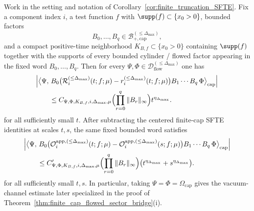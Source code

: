 \begin{propFspecial}\label{prop:finite_cap_bounded_factor_insertion}
Work in the setting and notation of Corollary~\ref{cor:finite_truncation_SFTE}.
Fix a component index $i$, a test function $f$ with $\supp(f)\subset\{x_0>0\}$, bounded factors
\[
B_0,\dots,B_q\in \mathcal B^{(\le \Delta_{\max})}_{+,\mathrm{cap}},
\]
and a compact positive-time neighborhood $K_{B,f}\subset\{x_0>0\}$ containing $\supp(f)$ together with the supports of every bounded cylinder / flowed factor appearing in the fixed word $B_0,\dots,B_q$.
Then for every $\Psi,\Phi\in \mathcal D^{(\le \Delta_{\max})}_{\mathrm{flow}}$ one has
\[
\begin{aligned}
&\Big|
\big\langle
\Psi,\,
B_0\bigl(\mathcal R_i^{(\le \Delta_{\max})}(t;f;\mu)-r_i^{(\le \Delta_{\max})}(t;f;\mu)\bigr)
B_1\cdots B_q\,\Phi
\big\rangle_{\mathrm{cap}}
\Big|\\
&\qquad\le
C_{\Psi,\Phi,K_{B,f},i,\Delta_{\max},\mu}
\Bigl(\prod_{r=0}^q \|B_r\|_{\infty}\Bigr)
 t^{\eta_{\Delta_{\max}}}.
\end{aligned}
\]
for all sufficiently small $t$.
After subtracting the centered finite-cap SFTE identities at scales $t,s$, the same fixed bounded word satisfies
\[
\begin{aligned}
&\Big|
\big\langle
\Psi,\,
B_0\bigl(
\mathcal O_i^{\mathrm{app},(\le \Delta_{\max})}(t;f;\mu)
-\mathcal O_i^{\mathrm{app},(\le \Delta_{\max})}(s;f;\mu)
\bigr)
B_1\cdots B_q\,\Phi
\big\rangle_{\mathrm{cap}}
\Big|\\
&\qquad\le
C'_{\Psi,\Phi,K_{B,f},i,\Delta_{\max},\mu}
\Bigl(\prod_{r=0}^q \|B_r\|_{\infty}\Bigr)
\bigl(t^{\eta_{\Delta_{\max}}}+s^{\eta_{\Delta_{\max}}}\bigr).
\end{aligned}
\]
for all sufficiently small $t,s$.
In particular, taking $\Psi=\Phi=\Omega_{\mathrm{cap}}$ gives the vacuum-channel estimate later specialized in the proof of Theorem~\ref{thm:finite_cap_flowed_sector_bridge}(i).
\end{propFspecial}

